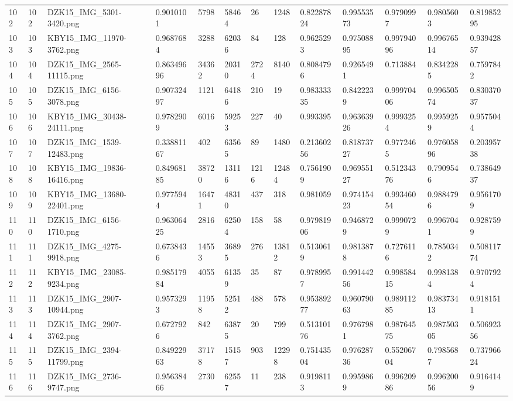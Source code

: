 \documentclass[11pt, a4paper, twoside]{report}
\begin{document}
\begin{longtable}[c]{@{}lllllllllllll@{}}
102 & 102 & DZK15\_IMG\_5301-3420.png & 0.9010101 & 5798 & 58464 & 26 & 1248 & 0.82287824 & 0.99553573 & 0.9790997 & 0.9805603 & 0.81985295 \\
103 & 103 & KBY15\_IMG\_11970-3762.png & 0.9687684 & 3288 & 62036 & 84 & 128 & 0.9625293 & 0.97508895 & 0.99794096 & 0.99676514 & 0.93942857 \\
104 & 104 & DZK15\_IMG\_2565-11115.png & 0.86349696 & 34362 & 20310 & 2724 & 8140 & 0.8084796 & 0.9265491 & 0.713884 & 0.8342285 & 0.7597842 \\
105 & 105 & DZK15\_IMG\_6156-3078.png & 0.90732497 & 1121 & 64186 & 210 & 19 & 0.98333335 & 0.8422239 & 0.99970406 & 0.99650574 & 0.83037037 \\
106 & 106 & KBY15\_IMG\_30438-24111.png & 0.9782909 & 6016 & 59253 & 227 & 40 & 0.993395 & 0.96363926 & 0.9993254 & 0.9959259 & 0.9575044 \\
107 & 107 & DZK15\_IMG\_1539-12483.png & 0.33881167 & 402 & 63565 & 89 & 1480 & 0.21360256 & 0.81873727 & 0.9772465 & 0.97605896 & 0.20395738 \\
108 & 108 & KBY15\_IMG\_19836-16416.png & 0.84968185 & 38720 & 13116 & 1216 & 12484 & 0.7561909 & 0.96955127 & 0.51234376 & 0.7909546 & 0.73864937 \\
109 & 109 & KBY15\_IMG\_13680-22401.png & 0.9775944 & 16471 & 48310 & 437 & 318 & 0.981059 & 0.97415423 & 0.99346054 & 0.9884796 & 0.9561709 \\
110 & 110 & DZK15\_IMG\_6156-1710.png & 0.96306425 & 2816 & 62504 & 158 & 58 & 0.97981906 & 0.9468729 & 0.9990729 & 0.9967041 & 0.9287599 \\
111 & 111 & DZK15\_IMG\_4275-9918.png & 0.6738436 & 14553 & 36895 & 276 & 13812 & 0.5130619 & 0.9813878 & 0.7276116 & 0.7850342 & 0.50811774 \\
112 & 112 & KBY15\_IMG\_23085-9234.png & 0.98517984 & 4055 & 61359 & 35 & 87 & 0.9789957 & 0.99144256 & 0.99858415 & 0.9981384 & 0.9707924 \\
113 & 113 & DZK15\_IMG\_2907-10944.png & 0.9573293 & 11958 & 52512 & 488 & 578 & 0.95389277 & 0.96079063 & 0.98911285 & 0.98373413 & 0.9181511 \\
114 & 114 & DZK15\_IMG\_2907-3762.png & 0.6727926 & 842 & 63875 & 20 & 799 & 0.51310176 & 0.9767981 & 0.98764575 & 0.98750305 & 0.50692356 \\
115 & 115 & DZK15\_IMG\_2394-11799.png & 0.84922963 & 37178 & 15157 & 903 & 12298 & 0.75143504 & 0.97628736 & 0.55206704 & 0.7985687 & 0.73796624 \\
116 & 116 & DZK15\_IMG\_2736-9747.png & 0.95638466 & 2730 & 62557 & 11 & 238 & 0.9198113 & 0.9959869 & 0.99620986 & 0.99620056 & 0.9164149 \\

\end{longtable}
\end{document}
